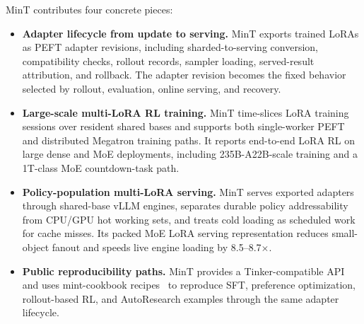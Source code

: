 MinT contributes four concrete pieces:

\begin{itemize}
    \item \textbf{Adapter lifecycle from update to serving.} MinT exports trained LoRAs as PEFT adapter revisions, including sharded-to-serving conversion, compatibility checks, rollout records, sampler loading, served-result attribution, and rollback. The adapter revision becomes the fixed behavior selected by rollout, evaluation, online serving, and recovery.

    \item \textbf{Large-scale multi-LoRA RL training.} MinT time-slices LoRA training sessions over resident shared bases and supports both single-worker PEFT and distributed Megatron training paths. It reports end-to-end LoRA RL on large dense and MoE deployments, including 235B-A22B-scale training and a 1T-class MoE countdown-task path.

    \item \textbf{Policy-population multi-LoRA serving.} MinT serves exported adapters through shared-base vLLM engines, separates durable policy addressability from CPU/GPU hot working sets, and treats cold loading as scheduled work for cache misses. Its packed MoE LoRA serving representation reduces small-object fanout and speeds live engine loading by 8.5--8.7$\times$.

    \item \textbf{Public reproducibility paths.} MinT provides a Tinker-compatible API~\citep{tinker2025,tinker_cookbook} and uses mint-cookbook recipes~\citep{mint_cookbook2026} to reproduce SFT, preference optimization, rollout-based RL, and AutoResearch examples through the same adapter lifecycle.
\end{itemize}






